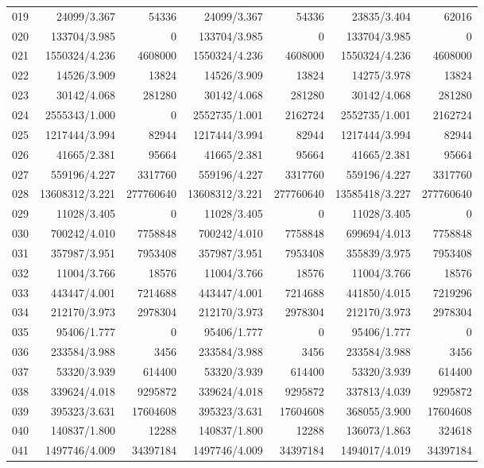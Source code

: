 \begin{longtable}{crrrrrr}
019 & 24099/3.367 & 54336 & 24099/3.367 & 54336 & 23835/3.404 & 62016 \\
020 & 133704/3.985 & 0 & 133704/3.985 & 0 & 133704/3.985 & 0 \\
021 & 1550324/4.236 & 4608000 & 1550324/4.236 & 4608000 & 1550324/4.236 & 4608000 \\
022 & 14526/3.909 & 13824 & 14526/3.909 & 13824 & 14275/3.978 & 13824 \\
023 & 30142/4.068 & 281280 & 30142/4.068 & 281280 & 30142/4.068 & 281280 \\
024 & 2555343/1.000 & 0 & 2552735/1.001 & 2162724 & 2552735/1.001 & 2162724 \\
025 & 1217444/3.994 & 82944 & 1217444/3.994 & 82944 & 1217444/3.994 & 82944 \\
026 & 41665/2.381 & 95664 & 41665/2.381 & 95664 & 41665/2.381 & 95664 \\
027 & 559196/4.227 & 3317760 & 559196/4.227 & 3317760 & 559196/4.227 & 3317760 \\
028 & 13608312/3.221 & 277760640 & 13608312/3.221 & 277760640 & 13585418/3.227 & 277760640 \\
029 & 11028/3.405 & 0 & 11028/3.405 & 0 & 11028/3.405 & 0 \\
030 & 700242/4.010 & 7758848 & 700242/4.010 & 7758848 & 699694/4.013 & 7758848 \\
031 & 357987/3.951 & 7953408 & 357987/3.951 & 7953408 & 355839/3.975 & 7953408 \\
032 & 11004/3.766 & 18576 & 11004/3.766 & 18576 & 11004/3.766 & 18576 \\
033 & 443447/4.001 & 7214688 & 443447/4.001 & 7214688 & 441850/4.015 & 7219296 \\
034 & 212170/3.973 & 2978304 & 212170/3.973 & 2978304 & 212170/3.973 & 2978304 \\
035 & 95406/1.777 & 0 & 95406/1.777 & 0 & 95406/1.777 & 0 \\
036 & 233584/3.988 & 3456 & 233584/3.988 & 3456 & 233584/3.988 & 3456 \\
037 & 53320/3.939 & 614400 & 53320/3.939 & 614400 & 53320/3.939 & 614400 \\
038 & 339624/4.018 & 9295872 & 339624/4.018 & 9295872 & 337813/4.039 & 9295872 \\
039 & 395323/3.631 & 17604608 & 395323/3.631 & 17604608 & 368055/3.900 & 17604608 \\
040 & 140837/1.800 & 12288 & 140837/1.800 & 12288 & 136073/1.863 & 324618 \\
041 & 1497746/4.009 & 34397184 & 1497746/4.009 & 34397184 & 1494017/4.019 & 34397184 \\

\end{longtable}
